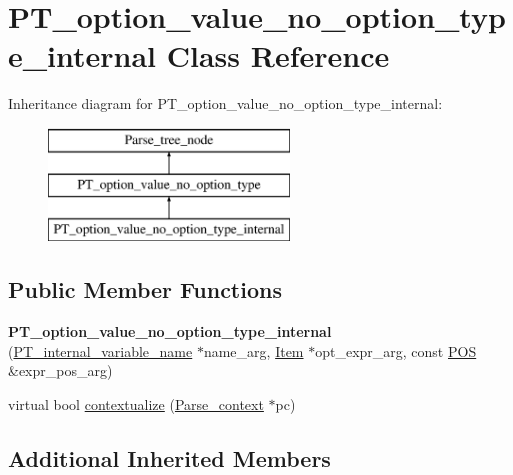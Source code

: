 \hypertarget{classPT__option__value__no__option__type__internal}{}\section{P\+T\+\_\+option\+\_\+value\+\_\+no\+\_\+option\+\_\+type\+\_\+internal Class Reference}
\label{classPT__option__value__no__option__type__internal}
Inheritance diagram for P\+T\+\_\+option\+\_\+value\+\_\+no\+\_\+option\+\_\+type\+\_\+internal\+:\begin{figure}[H]
\begin{center}
\leavevmode
\includegraphics[height=3.000000cm]{classPT__option__value__no__option__type__internal}
\end{center}
\end{figure}
\subsection*{Public Member Functions}
\begin{DoxyCompactItemize}
\item 
\mbox{\label{classPT__option__value__no__option__type__internal_a43355664fd3b230260e02bf23141c94b}} 
{\bfseries P\+T\+\_\+option\+\_\+value\+\_\+no\+\_\+option\+\_\+type\+\_\+internal} (\mbox{\hyperlink{classPT__internal__variable__name}{P\+T\+\_\+internal\+\_\+variable\+\_\+name}} $\ast$name\+\_\+arg, \mbox{\hyperlink{classItem}{Item}} $\ast$opt\+\_\+expr\+\_\+arg, const \mbox{\hyperlink{structYYLTYPE}{P\+OS}} \&expr\+\_\+pos\+\_\+arg)
\item 
virtual bool \mbox{\hyperlink{classPT__option__value__no__option__type__internal_a150386fb905d43f09154f649b8081c67}{contextualize}} (\mbox{\hyperlink{structParse__context}{Parse\+\_\+context}} $\ast$pc)
\end{DoxyCompactItemize}
\subsection*{Additional Inherited Members}


